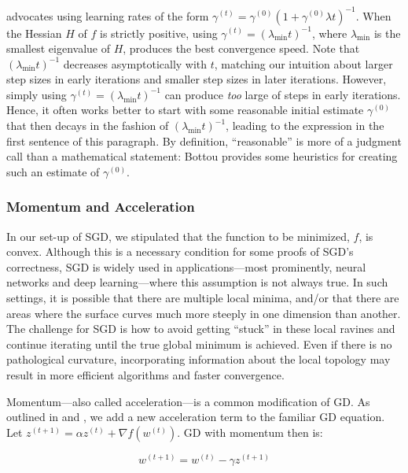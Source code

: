 \documentclass{article}
\begin{document}
\cite{bottou2012stochastic} advocates using learning rates of the form
$\gamma^{(t)} = \gamma^{(0)}(1 + \gamma^{(0)}\lambda t)^{-1}$. When the Hessian
$H$ of $f$ is strictly positive, using $\gamma^{(t)} =
(\lambda_{\mathrm{min}}t)^{-1}$, where $\lambda_{\mathrm{min}}$ is the smallest
eigenvalue of $H$, produces the best convergence speed. Note that $
(\lambda_{\mathrm{min}}t)^{-1}$ decreases asymptotically with $t$, matching our intuition
about larger step sizes in early iterations and smaller step sizes in later
iterations. However, simply using $\gamma^{(t)} =
(\lambda_{\mathrm{min}}t)^{-1}$ can produce \textit{too} large of steps in early
iterations. Hence, it often works better to start with some reasonable initial
estimate $\gamma^{(0)}$ that then decays in the fashion of
$(\lambda_{\mathrm{min}}t)^{-1}$, leading to the expression in the first
sentence of this paragraph. By definition, ``reasonable'' is more of a judgment
call than a mathematical statement: Bottou provides some heuristics for creating
such an estimate of $\gamma^{(0)}$.

\subsubsection{Momentum and Acceleration}

In our set-up of SGD, we stipulated that the function to be minimized, $f$, is
convex. Although this is a necessary condition for some proofs of SGD's
correctness, SGD is widely used in applications---most prominently, neural
networks and deep
learning---where this assumption is not
always true. In such settings, it is
possible that there are multiple local minima, and/or that there are areas where
the surface curves much more steeply in one dimension than another. The challenge for SGD is
how to avoid getting ``stuck'' in these local ravines and continue iterating
until the true global minimum is achieved. Even if there is no pathological
curvature, incorporating information about the local topology may result in more
efficient algorithms and faster convergence.

Momentum---also called acceleration---is a common modification of GD. As outlined in
\cite{rumelhart1986general} and 
\cite{qian1999momentum}, we add a new acceleration term to the familiar GD
equation. Let $z^{(t+1)} = \alpha z^{(t)} + \nabla f(w^{(t)})$. GD with
momentum then is:

\begin{equation}
	w^{(t+1)} = w^{(t)} - \gamma z^{(t+1)}
\end{equation}
\end{document}
